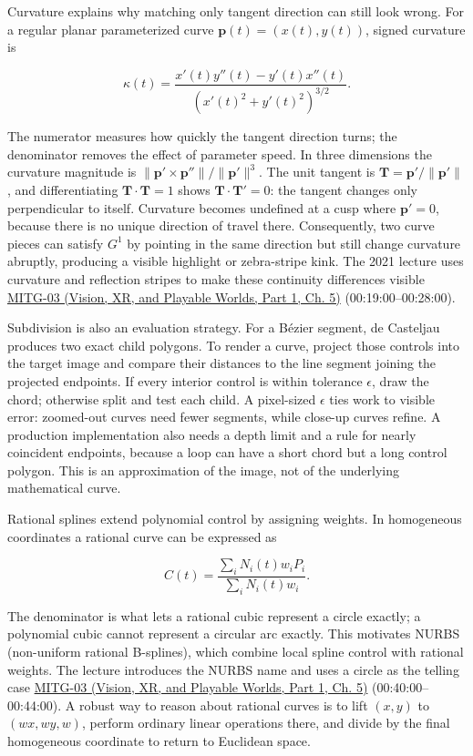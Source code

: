 Curvature explains why matching only tangent direction can still look wrong. For a regular planar parameterized curve \(\boldsymbol{p}(t)=(x(t),y(t))\), signed curvature is

\[
\kappa(t)=\frac{x'(t)y''(t)-y'(t)x''(t)}
{\left(x'(t)^2+y'(t)^2\right)^{3/2}}.
\]

The numerator measures how quickly the tangent direction turns; the denominator removes the effect of parameter speed. In three dimensions the curvature magnitude is \(\|\boldsymbol{p}'\times\boldsymbol{p}''\|/\|\boldsymbol{p}'\|^3\). The unit tangent is \(\boldsymbol{T}=\boldsymbol{p}'/\|\boldsymbol{p}'\|\), and differentiating \(\boldsymbol{T}\cdot\boldsymbol{T}=1\) shows \(\boldsymbol{T}\cdot\boldsymbol{T}'=0\): the tangent changes only perpendicular to itself. Curvature becomes undefined at a cusp where \(\boldsymbol{p}'=0\), because there is no unique direction of travel there. Consequently, two curve pieces can satisfy \(G^1\) by pointing in the same direction but still change curvature abruptly, producing a visible highlight or zebra-stripe kink. The 2021 lecture uses curvature and reflection stripes to make these continuity differences visible \href{../07-Vision-XR-and-Playable-Worlds-P01/main.pdf\#04-visual-computing-ii-ch036-mitg-03---curves-and-surfaces}{MITG-03 (Vision, XR, and Playable Worlds, Part 1, Ch. 5)} (00:19:00--00:28:00).

Subdivision is also an evaluation strategy. For a Bézier segment, de Casteljau produces two exact child polygons. To render a curve, project those controls into the target image and compare their distances to the line segment joining the projected endpoints. If every interior control is within tolerance \(\epsilon\), draw the chord; otherwise split and test each child. A pixel-sized \(\epsilon\) ties work to visible error: zoomed-out curves need fewer segments, while close-up curves refine. A production implementation also needs a depth limit and a rule for nearly coincident endpoints, because a loop can have a short chord but a long control polygon. This is an approximation of the image, not of the underlying mathematical curve.

Rational splines extend polynomial control by assigning weights. In homogeneous coordinates a rational curve can be expressed as

\[
C(t)=\frac{\sum_i N_i(t)w_iP_i}{\sum_i N_i(t)w_i}.
\]

The denominator is what lets a rational cubic represent a circle exactly; a polynomial cubic cannot represent a circular arc exactly. This motivates NURBS (non-uniform rational B-splines), which combine local spline control with rational weights. The lecture introduces the NURBS name and uses a circle as the telling case \href{../07-Vision-XR-and-Playable-Worlds-P01/main.pdf\#04-visual-computing-ii-ch036-mitg-03---curves-and-surfaces}{MITG-03 (Vision, XR, and Playable Worlds, Part 1, Ch. 5)} (00:40:00--00:44:00). A robust way to reason about rational curves is to lift \((x,y)\) to \((wx,wy,w)\), perform ordinary linear operations there, and divide by the final homogeneous coordinate to return to Euclidean space.

